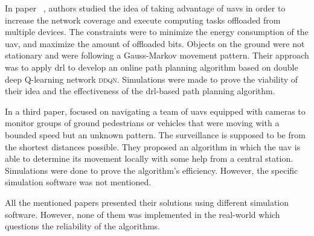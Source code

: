 \documentclass[../main.tex]{subfiles}
\begin{document}
		
		In paper ~\cite{pen21}, authors \citeauthor{pen21} studied the idea of taking advantage of \glspl{uav} in order to increase the network coverage and execute computing tasks offloaded from multiple devices. 
		The constraints were to minimize the energy consumption of the \gls{uav}, and maximize the amount of offloaded bits. 
		Objects on the ground were not stationary and were following a Gauss-Markov movement pattern. Their approach was to apply \gls{drl} to develop an online path planning algorithm based on double deep Q-learning network \textsc{ddqn}.
		Simulations were made to prove the viability of their idea and the effectiveness of the \gls{drl}-based path planning algorithm.
		
		In a third paper, \citeauthor{hua21} focused on navigating a team of \glspl{uav} equipped with cameras to monitor groups of ground pedestrians or vehicles that were moving with a bounded speed but an unknown pattern. 
		The surveillance is supposed to be from the shortest distances possible. 
		They proposed an algorithm in which the \gls{uav} is able to determine its movement locally with some help from a central station.
		Simulations were done to prove the algorithm's efficiency. However, the specific simulation software was not mentioned. 
		
		All the mentioned papers presented their solutions using different simulation software. However, none of them was implemented in the real-world which questions the reliability of the algorithms.




\blindtext
\end{document}
